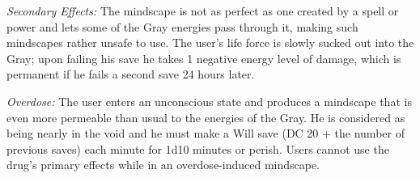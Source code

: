 \textit{Secondary Effects:} The mindscape is not as perfect as one created by a spell or power and lets some of the Gray energies pass through it, making such mindscapes rather unsafe to use. The user's life force is slowly sucked out into the Gray; upon failing his save he takes 1 negative energy level of damage, which is permanent if he fails a second save 24 hours later.

\textit{Overdose:} The user enters an unconscious state and produces a mindscape that is even more permeable than usual to the energies of the Gray. He is considered as being nearly in the void and he must make a Will save (DC 20 + the number of previous saves) each minute for 1d10 minutes or perish. Users cannot use the drug's primary effects while in an overdose-induced mindscape.